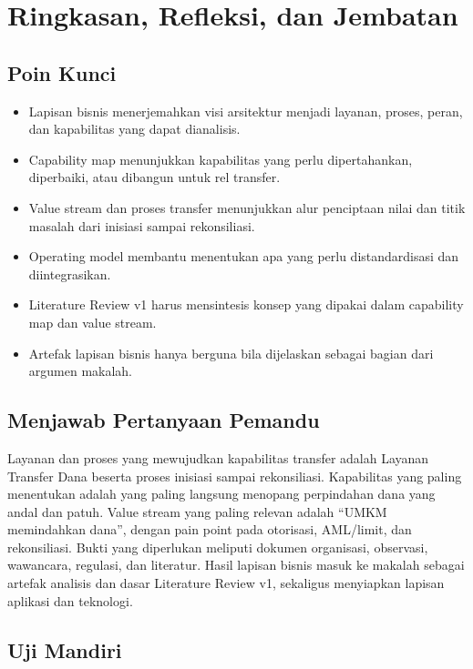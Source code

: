 \section{Ringkasan, Refleksi, dan Jembatan}

\subsection*{Poin Kunci}

\begin{itemize}
  \item Lapisan bisnis menerjemahkan visi arsitektur menjadi layanan, proses,
        peran, dan kapabilitas yang dapat dianalisis.
  \item Capability map menunjukkan kapabilitas yang perlu dipertahankan,
        diperbaiki, atau dibangun untuk rel transfer.
  \item Value stream dan proses transfer menunjukkan alur penciptaan nilai dan
        titik masalah dari inisiasi sampai rekonsiliasi.
  \item Operating model membantu menentukan apa yang perlu distandardisasi dan
        diintegrasikan.
  \item Literature Review v1 harus mensintesis konsep yang dipakai dalam
        capability map dan value stream.
  \item Artefak lapisan bisnis hanya berguna bila dijelaskan sebagai bagian dari
        argumen makalah.
\end{itemize}

\subsection*{Menjawab Pertanyaan Pemandu}

Layanan dan proses yang mewujudkan kapabilitas transfer adalah Layanan Transfer
Dana beserta proses inisiasi sampai rekonsiliasi. Kapabilitas yang paling
menentukan adalah yang paling langsung menopang perpindahan dana yang andal dan
patuh. Value stream yang paling relevan adalah ``UMKM memindahkan dana'', dengan
pain point pada otorisasi, AML/limit, dan rekonsiliasi. Bukti yang diperlukan
meliputi dokumen organisasi, observasi, wawancara, regulasi, dan literatur.
Hasil lapisan bisnis masuk ke makalah sebagai artefak analisis dan dasar
Literature Review v1, sekaligus menyiapkan lapisan aplikasi dan teknologi.

\subsection*{Uji Mandiri}


